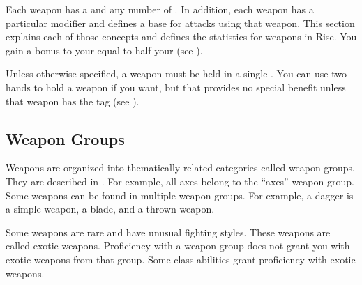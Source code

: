   Each weapon has a  and any number of .
  In addition, each weapon has a particular  modifier and defines a base  for attacks using that weapon.
  This section explains each of those concepts and defines the statistics for weapons in Rise.
  You gain a bonus to your  equal to half your  (see ).

  Unless otherwise specified, a weapon must be held in a single .
  You can use two hands to hold a weapon if you want, but that provides no special benefit unless that weapon has the  tag (see ).

  \subsection{Weapon Groups}\label{Weapon Groups}
    Weapons are organized into thematically related categories called weapon groups. They are described in . For example, all axes belong to the ``axes'' weapon group. Some weapons can be found in multiple weapon groups. For example, a dagger is a simple weapon, a blade, and a thrown weapon.

     Some weapons are rare and have unusual fighting styles.
    These weapons are called exotic weapons.
    Proficiency with a weapon group does not grant you with exotic weapons from that group.
    Some class abilities grant proficiency with exotic weapons.

